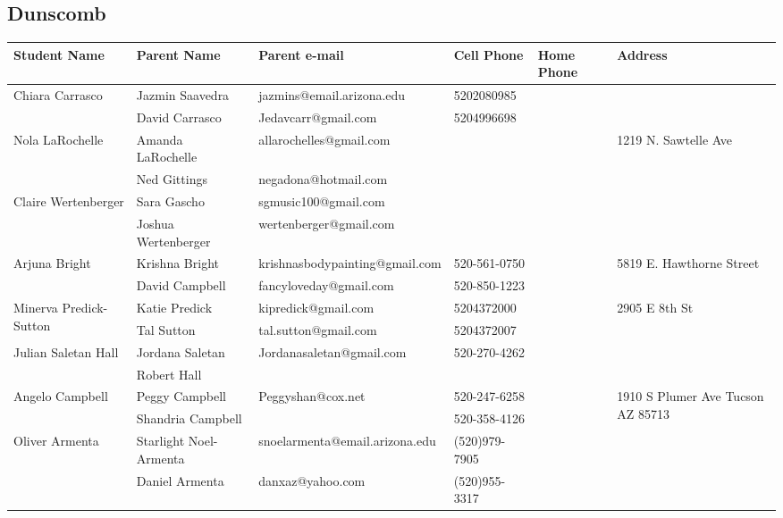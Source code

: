 \documentclass[landscape]{article}\usepackage[]{graphicx}\usepackage[]{color}
\begin{document}
\subsection{Dunscomb}
\begin{longtable}{p{70pt}|p{75pt}|p{120pt}|p{60pt}|p{60pt}|p{120pt}|}
Student Name & Parent Name & Parent e-mail & Cell Phone & Home Phone & Address\\
\hline
\multirow{2}{70pt}{Chiara Carrasco} & Jazmin Saavedra & jazmins@email.arizona.edu & 5202080985 &  & \multirow{2}{100pt}{} \\
 & David Carrasco & Jedavcarr@gmail.com & 5204996698 &  & \\
\hline
\multirow{2}{70pt}{Nola LaRochelle} & Amanda LaRochelle & allarochelles@gmail.com &  &  & \multirow{2}{100pt}{1219 N. Sawtelle Ave} \\
 & Ned Gittings & negadona@hotmail.com &  &  & \\
\hline
\multirow{2}{70pt}{Claire Wertenberger} & Sara Gascho & sgmusic100@gmail.com &  &  & \multirow{2}{100pt}{} \\
 & Joshua Wertenberger & wertenberger@gmail.com &  &  & \\
\hline
\multirow{2}{70pt}{Arjuna Bright} & Krishna Bright & krishnasbodypainting@gmail.com & 520-561-0750 &  & \multirow{2}{100pt}{5819 E. Hawthorne Street} \\
 & David Campbell & fancyloveday@gmail.com & 520-850-1223 &  & \\
\hline
\multirow{2}{70pt}{Minerva Predick-Sutton} & Katie Predick & kipredick@gmail.com & 5204372000 &  & \multirow{2}{100pt}{2905 E 8th St} \\
 & Tal Sutton & tal.sutton@gmail.com & 5204372007 &  & \\
\hline
\multirow{2}{70pt}{Julian Saletan Hall} & Jordana Saletan & Jordanasaletan@gmail.com & 520-270-4262 &  & \multirow{2}{100pt}{} \\
 & Robert Hall &  &  &  & \\
\hline
\multirow{2}{70pt}{Angelo Campbell } & Peggy Campbell  & Peggyshan@cox.net & 520-247-6258 &  & \multirow{2}{100pt}{1910 S Plumer Ave Tucson AZ 85713} \\
 & Shandria Campbell  &  & 520-358-4126 &  & \\
\hline
\multirow{2}{70pt}{Oliver Armenta} & Starlight Noel-Armenta & snoelarmenta@email.arizona.edu & (520)979-7905 &  & \multirow{2}{100pt}{} \\
 & Daniel Armenta  & danxaz@yahoo.com & (520)955-3317 &  & \\

\end{longtable}
\end{document}
